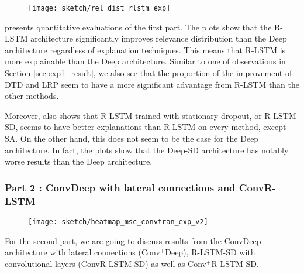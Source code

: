  \begin{figure}[!htb]
\centering
\texttt{[image: sketch/rel\_dist\_rlstm\_exp]}

\label{fig:rel_dist_rlstm_exp}
\end{figure}

\addfigure{\ref{fig:rel_dist_rlstm_exp}} presents quantitative evaluations of the first part. The plots show that the R-LSTM architecture significantly improves relevance distribution than the Deep architecture regardless of explanation techniques.  This means that R-LSTM is more explainable than the Deep architecture. Similar to one of observations in Section \ref{sec:exp1_result}, we also see that the proportion of the improvement of DTD and LRP seem to have a more significant advantage from R-LSTM than the other methods.  

Moreover, \addfigure{\ref{fig:rel_dist_rlstm_exp}}  also shows that  R-LSTM trained with stationary dropout, or R-LSTM-SD, seems to have better explanations than R-LSTM on every method, except SA. On the other hand, this does not seem to be the case for the Deep architecture. In fact, the plots show that the Deep-SD architecture has notably worse results than the Deep architecture.


\subsubsection{Part 2 : ConvDeep with lateral connections and ConvR-LSTM}
 \begin{figure}[!htb]
\centering
\texttt{[image: sketch/heatmap\_msc\_convtran\_exp\_v2]}
\label{fig:heatmap_msc_convtran_exp}
\end{figure}
For the second part, we are going to discuss results from the ConvDeep architecture with lateral connections (Conv$^+$Deep), R-LSTM-SD with convolutional layers (ConvR-LSTM-SD) as well as Conv$^+$R-LSTM-SD.

